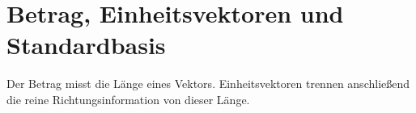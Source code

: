 \section{Betrag, Einheitsvektoren und Standardbasis}
\label{sec:vector_algebra_magnitude_basis}

Der Betrag misst die Länge eines Vektors. Einheitsvektoren trennen anschließend
die reine Richtungsinformation von dieser Länge.



